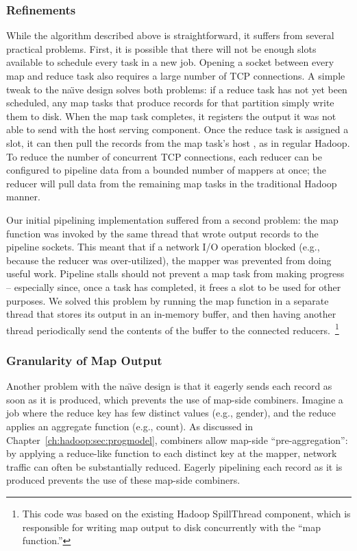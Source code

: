 \subsubsection{Refinements}
\label{ch:hop:sec:pipe-refine}

While the algorithm described above is straightforward, it suffers from several
practical problems.  First, it is possible that there will not be enough slots
available to schedule every task in a new job.  Opening a socket between every
map and reduce task also requires a large number of TCP connections.  A simple
tweak to the na\"{\i}ve design solves both problems: if a reduce task has not
yet been scheduled, any map tasks that produce records for that partition
simply write them to disk.  When the map task completes, it registers the output
it was not able to send with the host \TT serving component.  Once the reduce
task is assigned a slot, it can then pull the records from the map task's host
\TT, as in regular Hadoop.  To reduce the number of concurrent TCP connections,
each reducer can be configured to pipeline data from a bounded number of
mappers at once; the reducer will pull data from the remaining map tasks in the
traditional Hadoop manner.

Our initial pipelining implementation suffered from a second problem: the map
function was invoked by the same thread that wrote output records to the
pipeline sockets.  This meant that if a network I/O operation blocked (e.g.,
because the reducer was over-utilized), the mapper was prevented from doing
useful work.  Pipeline stalls should not prevent a map task from making
progress -- especially since, once a task has completed, it frees a {\TT} slot
to be used for other purposes.  We solved this problem by running the map
function in a separate thread that stores its output in an in-memory buffer,
and then having another thread periodically send the contents of the buffer to
the connected reducers.~\footnote{This code was based on the existing Hadoop
SpillThread component, which is responsible for writing map output to disk
concurrently with the ``map function.''}

\subsubsection{Granularity of Map Output}
\label{ch:hop:sec:mapout}

Another problem with the na\"{\i}ve design is that it eagerly sends each record
as soon as it is produced, which prevents the use of map-side combiners.
Imagine a job where the reduce key has few distinct values (e.g., gender), and
the reduce applies an aggregate function (e.g., count).  As discussed in
Chapter~\ref{ch:hadoop:sec:progmodel}, combiners allow map-side
``pre-aggregation'': by applying a reduce-like function to each distinct key at
the mapper, network traffic can often be substantially reduced.  Eagerly
pipelining each record as it is produced prevents the use of these map-side
combiners.

